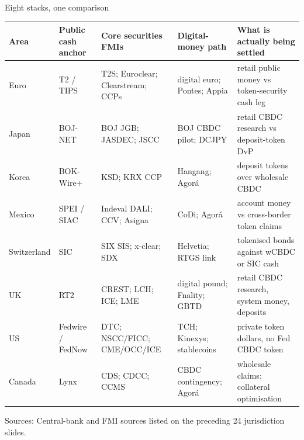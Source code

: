 \documentclass[aspectratio=169,12pt]{beamer}
\newcommand{\source}[1]{\vfill\par\fontsize{5.4}{6.5}\selectfont\color{Quiet}Sources: #1}
\begin{document}
\begin{frame}[shrink=20]{Eight stacks, one comparison}
  \fontsize{7.6}{9.15}\selectfont
  \begin{tabularx}{\textwidth}{L{1.05cm}L{1.35cm}L{2.65cm}L{2.4cm}Y}
    \toprule
    \textbf{Area} & \textbf{Public cash anchor} & \textbf{Core securities FMIs} & \textbf{Digital-money path} & \textbf{What is actually being settled} \\
    \midrule
    Euro & T2 / TIPS & T2S; Euroclear; Clearstream; CCPs & digital euro; Pontes; Appia & retail public money vs token-security cash leg \\
    Japan & BOJ-NET & BOJ JGB; JASDEC; JSCC & BOJ CBDC pilot; DCJPY & retail CBDC research vs deposit-token DvP \\
    Korea & BOK-Wire+ & KSD; KRX CCP & Hangang; Agor\'a & deposit tokens over wholesale CBDC \\
    Mexico & SPEI / SIAC & Indeval DALI; CCV; Asigna & CoDi; Agor\'a & account money vs cross-border token claims \\
    Switzerland & SIC & SIX SIS; x-clear; SDX & Helvetia; RTGS link & tokenised bonds against wCBDC or SIC cash \\
    UK & RT2 & CREST; LCH; ICE; LME & digital pound; Fnality; GBTD & retail CBDC research, system money, deposits \\
    US & Fedwire / FedNow & DTC; NSCC/FICC; CME/OCC/ICE & TCH; Kinexys; stablecoins & private token dollars, no Fed CBDC token \\
    Canada & Lynx & CDS; CDCC; CCMS & CBDC contingency; Agor\'a & wholesale claims; collateral optimisation \\
    \bottomrule
  \end{tabularx}
  \source{Central-bank and FMI sources listed on the preceding 24 jurisdiction slides.}
\end{frame}
\end{document}
